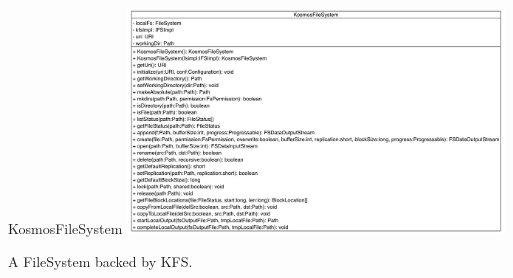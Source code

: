 \begin{XeClass}{KosmosFileSystem}
\includegraphics[width=10cm]{cdig/KosmosFileSystem.png}
     
 A FileSystem backed by KFS.

\end{XeClass}
